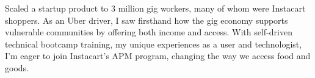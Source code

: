 
{

    Scaled a startup product to 3 million gig workers, many of whom were Instacart shoppers. As an Uber driver, I saw firsthand how the gig economy supports vulnerable communities by offering both income and access. With self-driven technical bootcamp training, my unique experiences as a user and technologist, I'm eager to join Instacart’s APM program, changing the way we access food and goods.
}